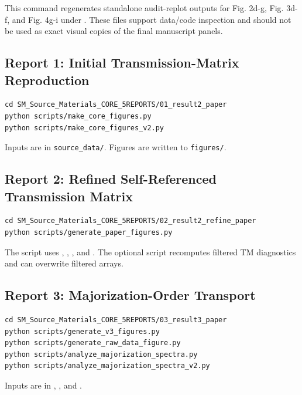 \documentclass[11pt]{article}
\begin{document}
This command regenerates standalone audit-replot outputs for Fig. 2d-g,
Fig. 3d-f, and Fig. 4g-i under
. These files support data/code
inspection and should not be used as exact visual copies of the final
manuscript panels.

\subsection*{Report 1: Initial Transmission-Matrix Reproduction}

\begin{verbatim}
cd SM_Source_Materials_CORE_5REPORTS/01_result2_paper
python scripts/make_core_figures.py
python scripts/make_core_figures_v2.py
\end{verbatim}

Inputs are in \texttt{source\_data/}. Figures are written to \texttt{figures/}.

\subsection*{Report 2: Refined Self-Referenced Transmission Matrix}

\begin{verbatim}
cd SM_Source_Materials_CORE_5REPORTS/02_result2_refine_paper
python scripts/generate_paper_figures.py
\end{verbatim}

The script uses ,
, ,
and . The optional script
 recomputes filtered TM diagnostics and can
overwrite filtered arrays.

\subsection*{Report 3: Majorization-Order Transport}

\begin{verbatim}
cd SM_Source_Materials_CORE_5REPORTS/03_result3_paper
python scripts/generate_v3_figures.py
python scripts/generate_raw_data_figure.py
python scripts/analyze_majorization_spectra.py
python scripts/analyze_majorization_spectra_v2.py
\end{verbatim}

Inputs are in ,
, and
.
\end{document}
